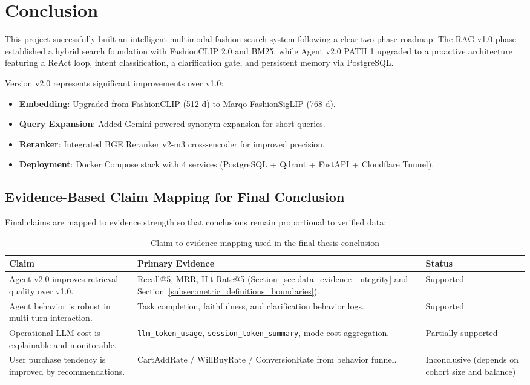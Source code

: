 \documentclass[12pt, twoside]{report}
\begin{document}
\section{Conclusion}
This project successfully built an intelligent multimodal fashion search system following a clear two-phase roadmap. The RAG v1.0 phase established a hybrid search foundation with FashionCLIP 2.0 and BM25, while Agent v2.0 PATH 1 upgraded to a proactive architecture featuring a ReAct loop, intent classification, a clarification gate, and persistent memory via PostgreSQL.

Version v2.0 represents significant improvements over v1.0:
\begin{itemize}
    \item \textbf{Embedding}: Upgraded from FashionCLIP (512-d) to Marqo-FashionSigLIP (768-d).
    \item \textbf{Query Expansion}: Added Gemini-powered synonym expansion for short queries.
    \item \textbf{Reranker}: Integrated BGE Reranker v2-m3 cross-encoder for improved precision.
    \item \textbf{Deployment}: Docker Compose stack with 4 services (PostgreSQL + Qdrant + FastAPI + Cloudflare Tunnel).
\end{itemize}

\subsection{Evidence-Based Claim Mapping for Final Conclusion}
\label{subsec:evidence_claim_mapping}

Final claims are mapped to evidence strength so that conclusions remain proportional to verified data:

\begin{table}[H]
\centering
\begin{tabular}{p{4.0cm}p{5.8cm}p{3.0cm}}
\toprule
\textbf{Claim} & \textbf{Primary Evidence} & \textbf{Status}\\
\midrule
Agent v2.0 improves retrieval quality over v1.0. & Recall@5, MRR, Hit Rate@5 (Section~\ref{sec:data_evidence_integrity} and Section~\ref{subsec:metric_definitions_boundaries}). & Supported\\
Agent behavior is robust in multi-turn interaction. & Task completion, faithfulness, and clarification behavior logs. & Supported\\
Operational LLM cost is explainable and monitorable. & \texttt{llm\_token\_usage}, \texttt{session\_token\_summary}, mode cost aggregation. & Partially supported\\
User purchase tendency is improved by recommendations. & CartAddRate / WillBuyRate / ConversionRate from behavior funnel. & Inconclusive (depends on cohort size and balance)\\
\bottomrule
\end{tabular}
\caption{Claim-to-evidence mapping used in the final thesis conclusion}
\label{tab:claim_evidence_mapping}
\end{table}
\end{document}
